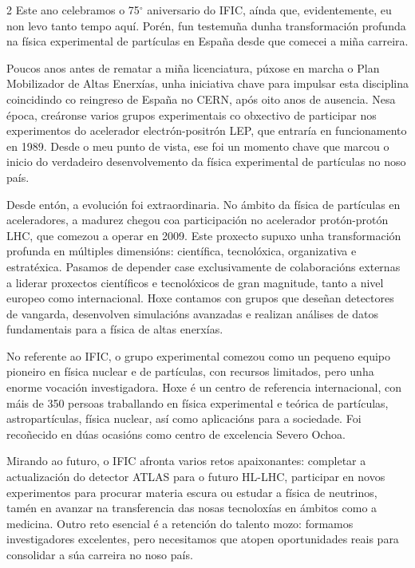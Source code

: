 \begin{multicols}{2}
Este ano celebramos o 75$^{\circ}$ aniversario do IFIC, aínda que,
evidentemente, eu non levo tanto tempo aquí. Porén, fun testemuña dunha
transformación profunda na física experimental de partículas en España desde
que comecei a miña carreira.

Poucos anos antes de rematar a miña licenciatura, púxose en marcha o Plan
Mobilizador de Altas Enerxías, unha iniciativa chave para impulsar esta
disciplina coincidindo co reingreso de España no CERN, após oito anos de
ausencia. Nesa época, creáronse varios grupos experimentais co obxectivo de
participar nos experimentos do acelerador electrón-positrón LEP, que entraría
en funcionamento en 1989. Desde o meu punto de vista, ese foi un momento chave
que marcou o inicio do verdadeiro desenvolvemento da física experimental de
partículas no noso país.

Desde entón, a evolución foi extraordinaria. No ámbito da física de partículas
en aceleradores, a madurez chegou coa participación no acelerador protón-protón
LHC, que comezou a operar en 2009. Este proxecto supuxo unha transformación
profunda en múltiples dimensións: científica, tecnolóxica, organizativa e
estratéxica. Pasamos de depender case exclusivamente de colaboracións externas
a liderar proxectos científicos e tecnolóxicos de gran magnitude, tanto a nivel
europeo como internacional. Hoxe contamos con grupos que deseñan detectores de
vangarda, desenvolven simulacións avanzadas e realizan análises de datos
fundamentais para a física de altas enerxías.

No referente ao IFIC, o grupo experimental comezou como un pequeno equipo
pioneiro en física nuclear e de partículas, con recursos limitados, pero unha
enorme vocación investigadora. Hoxe é un centro de referencia internacional,
con máis de 350 persoas traballando en física experimental e teórica de
partículas, astropartículas, física nuclear, así como aplicacións para a
sociedade. Foi recoñecido en dúas ocasións como centro de excelencia Severo
Ochoa.

Mirando ao futuro, o IFIC afronta varios retos apaixonantes: completar a
actualización do detector ATLAS para o futuro HL-LHC, participar en novos
experimentos para procurar materia escura ou estudar a física de neutrinos, tamén en
avanzar na transferencia das nosas tecnoloxías en ámbitos como a medicina.
Outro reto esencial é a retención do talento mozo: formamos investigadores
excelentes, pero necesitamos que atopen oportunidades reais para consolidar a
súa carreira no noso país.


\end{multicols}
